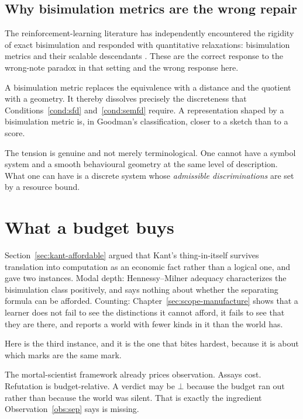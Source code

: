 \subsection{Why bisimulation metrics are the wrong repair}
\label{sec:metrics}

The reinforcement-learning literature has independently encountered
the rigidity of exact bisimulation and responded with quantitative
relaxations: bisimulation metrics \cite{ferns2004} and their
scalable descendants \cite{gelada2019,zhang2021,castro2021}.
These are the correct response to the wrong-note paradox in that
setting and the wrong response here.

\begin{observation}
\label{obs:metric}
A bisimulation metric replaces the equivalence with a distance and
the quotient with a geometry.
It thereby dissolves precisely the discreteness that
Conditions~\ref{cond:sfd} and~\ref{cond:semfd} require.
A representation shaped by a bisimulation metric is, in Goodman's
classification, closer to a sketch than to a score.
\end{observation}

\noindent
The tension is genuine and not merely terminological.
One cannot have a symbol system and a smooth behavioural geometry
at the same level of description.
What one can have is a discrete system whose \emph{admissible
discriminations} are set by a resource bound.

\section{What a budget buys}
\label{sec:budget}

Section~\ref{sec:kant-affordable} argued that Kant's thing-in-itself
survives translation into computation as an economic fact rather
than a logical one, and gave two instances.
Modal depth: Hennessy--Milner adequacy characterizes the
bisimulation class positively, and says nothing about whether the
separating formula can be afforded.
Counting: Chapter~\ref{sec:scope-manufacture} shows that a learner
does not fail to see the distinctions it cannot afford, it fails to
see that they are there, and reports a world with fewer kinds in it
than the world has.

Here is the third instance, and it is the one that bites hardest,
because it is about which marks are the same mark.

The mortal-scientist framework already prices observation.
Assays cost.
Refutation is budget-relative.
A verdict may be $\bot$ because the budget ran out rather than
because the world was silent.
That is exactly the ingredient Observation~\ref{obs:sep} says is
missing.

